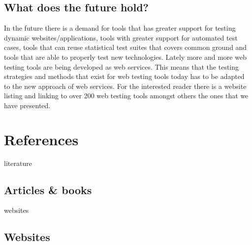 \documentclass[a4paper]{article}
\begin{document}
\subsection{What does the future hold?}

In the future there is a demand for tools that has greater support for testing dynamic websites/applications, tools 
with greater support for automated test cases, tools that can reuse statistical test suites that covers common ground 
and tools that are able to properly test new technologies. Lately more and more web testing tools are being developed
as web services. This means that the testing strategies and methods that exist for web testing tools today has to be 
adapted to the new approach of web services.\cite{dlf07} For the interested reader there is a website listing and linking to over
200 web testing tools amongst others the ones that we have presented. \cite{softqa}


\newpage
\appendix

\section{References}

\begin{btSect}[alpha]{literature}
\subsection{Articles \& books}
\btPrintAll
\end{btSect}

\begin{btSect}[alpha]{websites}
\subsection{Websites}
\btPrintAll
\end{btSect}
\end{document}
